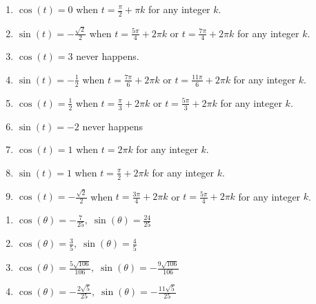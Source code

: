\documentclass{ximera}
\begin{document}
\begin{enumerate}

\setcounter{enumi}{\value{HW}}

\item $\cos(t) = 0$ when $t = \frac{\pi}{2} + \pi k$ for any integer $k$.
\item $\sin(t) = -\frac{\sqrt{2}}{2}$ when $t = \frac{5\pi}{4} + 2\pi k$ or $t = \frac{7\pi}{4} + 2\pi k$ for any integer $k$.
\item $\cos(t) = 3$ never happens.  
\item $\sin(t) = -\frac{1}{2}$ when $t = \frac{7\pi}{6} + 2\pi k$ or $t = \frac{11\pi}{6} + 2\pi k$ for any integer $k$.
\item $\cos(t) = \frac{1}{2}$ when $t = \frac{\pi}{3} + 2\pi k$ or $t = \frac{5\pi}{3} + 2\pi k$ for any integer $k$.
\item $\sin(t) = -2$ never happens
\item $\cos(t) = 1$ when $t = 2\pi k$ for any integer $k$.
\item $\sin(t) = 1$ when $t = \frac{\pi}{2} + 2\pi k$ for any integer $k$.
\item $\cos(t) = -\frac{\sqrt{2}}{2}$ when $t = \frac{3\pi}{4} + 2\pi k$ or $t = \frac{5\pi}{4} + 2\pi k$ for any integer $k$.

\setcounter{HW}{\value{enumi}}

\end{enumerate}

\begin{enumerate}

\setcounter{enumi}{\value{HW}}

\item $\cos(\theta) = -\frac{7}{25}, \; \sin(\theta) = \frac{24}{25}$

\item $\cos(\theta) = \frac{3}{5}, \; \sin(\theta) = \frac{4}{5}$

\item $\cos(\theta) = \frac{5\sqrt{106}}{106}, \; \sin(\theta) = -\frac{9\sqrt{106}}{106}$

\item $\cos(\theta) = -\frac{2\sqrt{5}}{25}, \; \sin(\theta) = -\frac{11\sqrt{5}}{25}$

\setcounter{HW}{\value{enumi}}

\end{enumerate}
\end{document}

